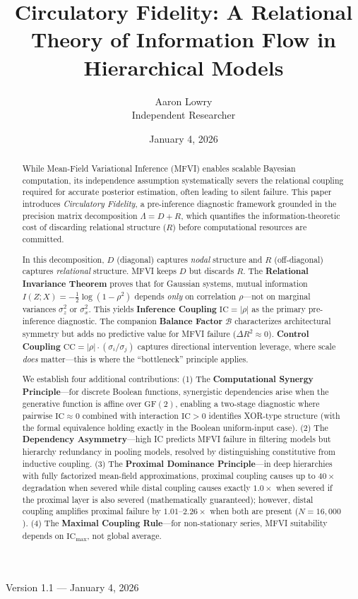 \documentclass[10pt]{article} %
\title{Circulatory Fidelity: A Relational Theory of Information Flow in Hierarchical Models}
\author{\name Aaron Lowry \\
      \addr Independent Researcher}
\date{January 4, 2026}
\theoremstyle{plain}
\theoremstyle{definition}
\newcommand{\IC}{\mathrm{IC}}  %
\newcommand{\BB}{\mathcal{B}}  %
\newcommand{\CC}{\mathrm{CC}}  %
\begin{document}
\maketitle

\begin{center}
{\large Version 1.1 --- January 4, 2026}
\end{center}
\vspace{-1em}

\begin{abstract}
While Mean-Field Variational Inference (MFVI) enables scalable Bayesian computation, its independence assumption systematically severs the relational coupling required for accurate posterior estimation, often leading to silent failure. This paper introduces \emph{Circulatory Fidelity}, a pre-inference diagnostic framework grounded in the precision matrix decomposition $\Lambda = D + R$, which quantifies the information-theoretic cost of discarding relational structure ($R$) before computational resources are committed.

In this decomposition, $D$ (diagonal) captures \emph{nodal} structure and $R$ (off-diagonal) captures \emph{relational} structure. MFVI keeps $D$ but discards $R$. The \textbf{Relational Invariance Theorem} proves that for Gaussian systems, mutual information $I(Z;X) = -\frac{1}{2}\log(1-\rho^2)$ depends \emph{only} on correlation $\rho$---not on marginal variances $\sigma_z^2$ or $\sigma_x^2$. This yields \textbf{Inference Coupling} $\IC = |\rho|$ as the primary pre-inference diagnostic. The companion \textbf{Balance Factor} $\BB$ characterizes architectural symmetry but adds no predictive value for MFVI failure ($\Delta R^2 \approx 0$). \textbf{Control Coupling} $\CC = |\rho| \cdot (\sigma_i/\sigma_j)$ captures directional intervention leverage, where scale \emph{does} matter---this is where the ``bottleneck'' principle applies.

We establish four additional contributions: (1) The \textbf{Computational Synergy Principle}---for discrete Boolean functions, synergistic dependencies arise when the generative function is affine over $\text{GF}(2)$, enabling a two-stage diagnostic where pairwise $\IC \approx 0$ combined with interaction $\IC > 0$ identifies XOR-type structure (with the formal equivalence holding exactly in the Boolean uniform-input case). (2) The \textbf{Dependency Asymmetry}---high IC predicts MFVI failure in filtering models but hierarchy redundancy in pooling models, resolved by distinguishing constitutive from inductive coupling. (3) The \textbf{Proximal Dominance Principle}---in deep hierarchies with fully factorized mean-field approximations, proximal coupling causes up to $40\times$ degradation when severed while distal coupling causes exactly $1.0\times$ when severed if the proximal layer is also severed (mathematically guaranteed); however, distal coupling amplifies proximal failure by $1.01$--$2.26\times$ when both are present ($N = 16{,}000$). (4) The \textbf{Maximal Coupling Rule}---for non-stationary series, MFVI suitability depends on $\IC_{\max}$, not global average.


\end{abstract}
\end{document}
